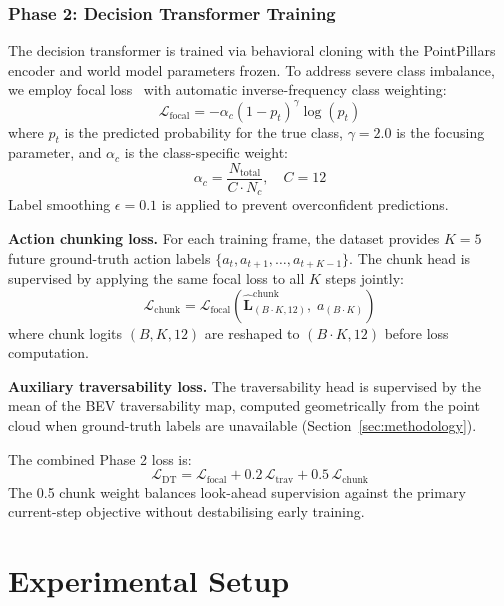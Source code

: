 \documentclass[sensors,article,submit,pdftex,moreauthors]{Definitions/mdpi}
\begin{document}
\subsubsection{Phase 2: Decision Transformer Training}
The decision transformer is trained via behavioral cloning with the PointPillars encoder and world model parameters frozen. To address severe class imbalance, we employ focal loss~\cite{lin2017} with automatic inverse-frequency class weighting:
\begin{equation}
    \mathcal{L}_\text{focal} = -\alpha_c (1 - p_t)^\gamma \log(p_t)
\end{equation}
where $p_t$ is the predicted probability for the true class, $\gamma{=}2.0$ is the focusing parameter, and $\alpha_c$ is the class-specific weight:
\begin{equation}
    \alpha_c = \frac{N_\text{total}}{C \cdot N_c}, \quad C = 12
\end{equation}
Label smoothing $\epsilon{=}0.1$ is applied to prevent overconfident predictions.

\textbf{Action chunking loss.}
For each training frame, the dataset provides $K{=}5$ future ground-truth action labels $\{a_t, a_{t+1}, \ldots, a_{t+K-1}\}$. The chunk head is supervised by applying the same focal loss to all $K$ steps jointly:
\begin{equation}
    \mathcal{L}_\text{chunk} = \mathcal{L}_\text{focal}\!\left(\hat{\mathbf{L}}^\text{chunk}_{(B \cdot K, 12)},\; a_{(B \cdot K)}\right)
\end{equation}
where chunk logits $(B, K, 12)$ are reshaped to $(B{\cdot}K, 12)$ before loss computation.

\textbf{Auxiliary traversability loss.}
The traversability head is supervised by the mean of the BEV traversability map, computed geometrically from the point cloud when ground-truth labels are unavailable (Section~\ref{sec:methodology}).

The combined Phase 2 loss is:
\begin{equation}
    \mathcal{L}_\text{DT} = \mathcal{L}_\text{focal} + 0.2\,\mathcal{L}_\text{trav} + 0.5\,\mathcal{L}_\text{chunk}
\end{equation}
The 0.5 chunk weight balances look-ahead supervision against the primary current-step objective without destabilising early training.

\section{Experimental Setup}
\label{sec:experiments}
\end{document}
